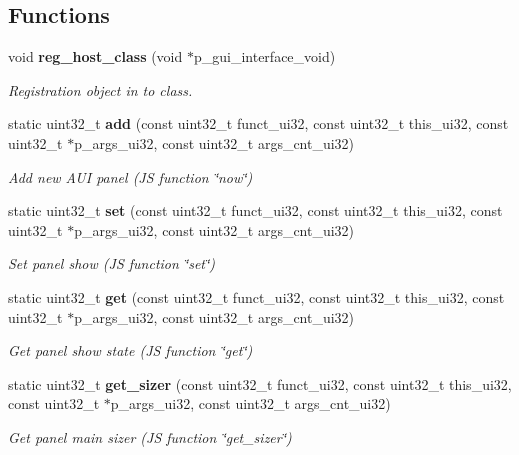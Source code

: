 \subsection*{Functions}
\begin{DoxyCompactItemize}
\item 
void \textbf{ reg\+\_\+host\+\_\+class} (void $\ast$p\+\_\+gui\+\_\+interface\+\_\+void)
\begin{DoxyCompactList}\small\item\em Registration object in to class. \end{DoxyCompactList}\item 
static uint32\+\_\+t \textbf{ add} (const uint32\+\_\+t funct\+\_\+ui32, const uint32\+\_\+t this\+\_\+ui32, const uint32\+\_\+t $\ast$p\+\_\+args\+\_\+ui32, const uint32\+\_\+t args\+\_\+cnt\+\_\+ui32)
\begin{DoxyCompactList}\small\item\em Add new A\+UI panel (JS function \char`\"{}now\char`\"{}) \end{DoxyCompactList}\item 
static uint32\+\_\+t \textbf{ set} (const uint32\+\_\+t funct\+\_\+ui32, const uint32\+\_\+t this\+\_\+ui32, const uint32\+\_\+t $\ast$p\+\_\+args\+\_\+ui32, const uint32\+\_\+t args\+\_\+cnt\+\_\+ui32)
\begin{DoxyCompactList}\small\item\em Set panel show (JS function \char`\"{}set\char`\"{}) \end{DoxyCompactList}\item 
static uint32\+\_\+t \textbf{ get} (const uint32\+\_\+t funct\+\_\+ui32, const uint32\+\_\+t this\+\_\+ui32, const uint32\+\_\+t $\ast$p\+\_\+args\+\_\+ui32, const uint32\+\_\+t args\+\_\+cnt\+\_\+ui32)
\begin{DoxyCompactList}\small\item\em Get panel show state (JS function \char`\"{}get\char`\"{}) \end{DoxyCompactList}\item 
static uint32\+\_\+t \textbf{ get\+\_\+sizer} (const uint32\+\_\+t funct\+\_\+ui32, const uint32\+\_\+t this\+\_\+ui32, const uint32\+\_\+t $\ast$p\+\_\+args\+\_\+ui32, const uint32\+\_\+t args\+\_\+cnt\+\_\+ui32)
\begin{DoxyCompactList}\small\item\em Get panel main sizer (JS function \char`\"{}get\+\_\+sizer\char`\"{}) \end{DoxyCompactList}\item 

\end{DoxyCompactItemize}
